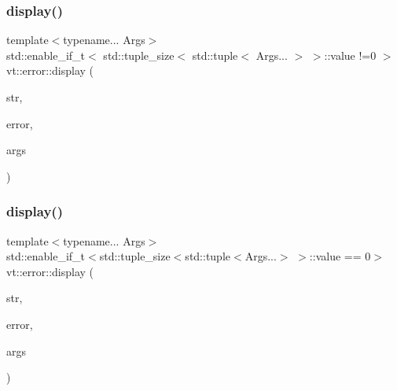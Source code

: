 \subsubsection{\texorpdfstring{display()}{display()}\hspace{0.1cm}{\footnotesize\ttfamily [2/3]}}
{\footnotesize\ttfamily template$<$typename... Args$>$ \\
std\+::enable\+\_\+if\+\_\+t$<$ std\+::tuple\+\_\+size$<$ std\+::tuple$<$ Args... $>$ $>$\+::value !=0 $>$ vt\+::error\+::display (\begin{DoxyParamCaption}\item[{std\+::string const \&}]{str,  }\item[{\hyperlink{namespacevt_a793764d753923abc3d32929870beb485}{Error\+Code\+Type}}]{error,  }\item[{Args \&\&...}]{args }\end{DoxyParamCaption})\hspace{0.3cm}{\ttfamily [inline]}}

\mbox{\label{namespacevt_1_1error_a2b3a36c6f424bac4312fa98eae1a269c}} 
\subsubsection{\texorpdfstring{display()}{display()}\hspace{0.1cm}{\footnotesize\ttfamily [3/3]}}
{\footnotesize\ttfamily template$<$typename... Args$>$ \\
std\+::enable\+\_\+if\+\_\+t$<$std\+::tuple\+\_\+size$<$std\+::tuple$<$Args...$>$ $>$\+::value == 0$>$ vt\+::error\+::display (\begin{DoxyParamCaption}\item[{std\+::string const \&}]{str,  }\item[{\hyperlink{namespacevt_a793764d753923abc3d32929870beb485}{Error\+Code\+Type}}]{error,  }\item[{\mbox{[}\mbox{[}maybe\+\_\+unused\mbox{]} \mbox{]} Args \&\&...}]{args }\end{DoxyParamCaption})\hspace{0.3cm}{\ttfamily [inline]}}

\mbox{\label{namespacevt_1_1error_aa05507e862c21c1b4e3dbe29d86f05f6}} 
